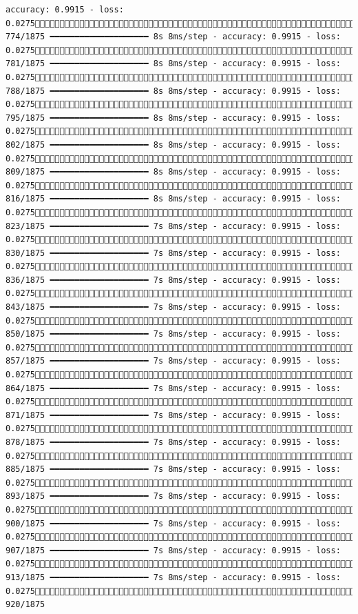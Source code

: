 \documentclass[
  letterpaper,
  DIV=11,
  numbers=noendperiod]{scrreprt}
\begin{document}
\begin{verbatim}
accuracy: 0.9915 - loss: 0.0275 774/1875 ━━━━━━━━━━━━━━━━━━━━ 8s 8ms/step - accuracy: 0.9915 - loss: 0.0275 781/1875 ━━━━━━━━━━━━━━━━━━━━ 8s 8ms/step - accuracy: 0.9915 - loss: 0.0275 788/1875 ━━━━━━━━━━━━━━━━━━━━ 8s 8ms/step - accuracy: 0.9915 - loss: 0.0275 795/1875 ━━━━━━━━━━━━━━━━━━━━ 8s 8ms/step - accuracy: 0.9915 - loss: 0.0275 802/1875 ━━━━━━━━━━━━━━━━━━━━ 8s 8ms/step - accuracy: 0.9915 - loss: 0.0275 809/1875 ━━━━━━━━━━━━━━━━━━━━ 8s 8ms/step - accuracy: 0.9915 - loss: 0.0275 816/1875 ━━━━━━━━━━━━━━━━━━━━ 8s 8ms/step - accuracy: 0.9915 - loss: 0.0275 823/1875 ━━━━━━━━━━━━━━━━━━━━ 7s 8ms/step - accuracy: 0.9915 - loss: 0.0275 830/1875 ━━━━━━━━━━━━━━━━━━━━ 7s 8ms/step - accuracy: 0.9915 - loss: 0.0275 836/1875 ━━━━━━━━━━━━━━━━━━━━ 7s 8ms/step - accuracy: 0.9915 - loss: 0.0275 843/1875 ━━━━━━━━━━━━━━━━━━━━ 7s 8ms/step - accuracy: 0.9915 - loss: 0.0275 850/1875 ━━━━━━━━━━━━━━━━━━━━ 7s 8ms/step - accuracy: 0.9915 - loss: 0.0275 857/1875 ━━━━━━━━━━━━━━━━━━━━ 7s 8ms/step - accuracy: 0.9915 - loss: 0.0275 864/1875 ━━━━━━━━━━━━━━━━━━━━ 7s 8ms/step - accuracy: 0.9915 - loss: 0.0275 871/1875 ━━━━━━━━━━━━━━━━━━━━ 7s 8ms/step - accuracy: 0.9915 - loss: 0.0275 878/1875 ━━━━━━━━━━━━━━━━━━━━ 7s 8ms/step - accuracy: 0.9915 - loss: 0.0275 885/1875 ━━━━━━━━━━━━━━━━━━━━ 7s 8ms/step - accuracy: 0.9915 - loss: 0.0275 893/1875 ━━━━━━━━━━━━━━━━━━━━ 7s 8ms/step - accuracy: 0.9915 - loss: 0.0275 900/1875 ━━━━━━━━━━━━━━━━━━━━ 7s 8ms/step - accuracy: 0.9915 - loss: 0.0275 907/1875 ━━━━━━━━━━━━━━━━━━━━ 7s 8ms/step - accuracy: 0.9915 - loss: 0.0275 913/1875 ━━━━━━━━━━━━━━━━━━━━ 7s 8ms/step - accuracy: 0.9915 - loss: 0.0275 920/1875 
\end{verbatim}
\end{document}
